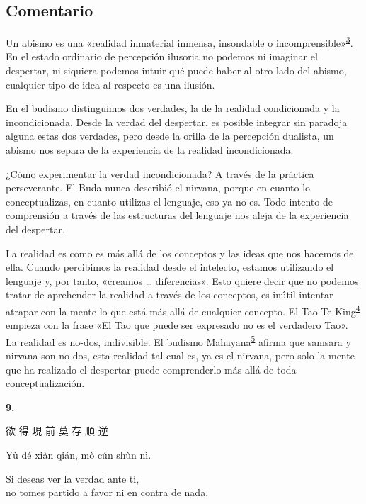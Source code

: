\documentclass[
  a5paperpaper,
]{article}
\begin{document}
\hypertarget{comentario-7}{%
\subsection{Comentario}\label{comentario-7}}

Un abismo es una «realidad inmaterial inmensa, insondable o
incomprensible»\textsuperscript{\protect\hypertarget{ref3}{\protect\hyperlink{nota3}{3}}}.
En el estado ordinario de percepción ilusoria no podemos ni imaginar el
despertar, ni siquiera podemos intuir qué puede haber al otro lado del
abismo, cualquier tipo de idea al respecto es una ilusión.

En el budismo distinguimos dos verdades, la de la realidad condicionada
y la incondicionada. Desde la verdad del despertar, es posible integrar
sin paradoja alguna estas dos verdades, pero desde la orilla de la
percepción dualista, un abismo nos separa de la experiencia de la
realidad incondicionada.

¿Cómo experimentar la verdad incondicionada? A través de la práctica
perseverante. El Buda nunca describió el nirvana, porque en cuanto lo
conceptualizas, en cuanto utilizas el lenguaje, eso ya no es. Todo
intento de comprensión a través de las estructuras del lenguaje nos
aleja de la experiencia del despertar.

La realidad es como es más allá de los conceptos y las ideas que nos
hacemos de ella. Cuando percibimos la realidad desde el intelecto,
estamos utilizando el lenguaje y, por tanto, «creamos \ldots{}
diferencias». Esto quiere decir que no podemos tratar de aprehender la
realidad a través de los conceptos, es inútil intentar atrapar con la
mente lo que está más allá de cualquier concepto. El Tao Te
King\textsuperscript{\protect\hypertarget{ref4}{\protect\hyperlink{nota4}{4}}}
empieza con la frase «El Tao que puede ser expresado no es el verdadero
Tao». La realidad es no-dos, indivisible. El budismo
Mahayana\textsuperscript{\protect\hypertarget{ref5}{\protect\hyperlink{nota4}{5}}}
afirma que samsara y nirvana son no dos, esta realidad tal cual es, ya
es el nirvana, pero solo la mente que ha realizado el despertar puede
comprenderlo más allá de toda conceptualización.

\hfill\break

\hypertarget{04}{}
\begin{verseblock}

\newpage

\begin{center}\textbf{9.}\end{center}

欲 得 現 前 莫 存 順 逆

Yù dé xiàn qián, mò cún shùn nì.

Si deseas ver la verdad ante ti,\\
no tomes partido a favor ni en contra de nada.

\end{verseblock}
\end{document}
